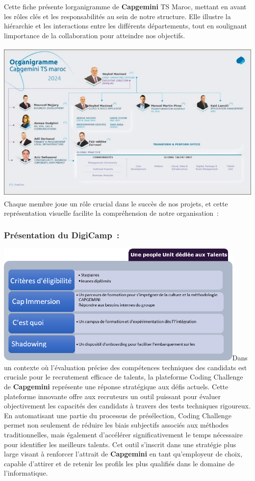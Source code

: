 \documentclass[12pt,a4paper,twoside]{report}
\begin{document}
Cette fiche présente l\textquotesingle organigramme de
\textbf{Capgemini} TS Maroc, mettant en avant les rôles clés et les
responsabilités au sein de notre structure. Elle illustre la hiérarchie
et les interactions entre les différents départements, tout en
soulignant l\textquotesingle importance de la collaboration pour
atteindre nos objectifs.

\includegraphics[width=5.4in,height=3.17361in]{latex_media/media/image5.jpeg}Chaque
membre joue un rôle crucial dans le succès de nos projets, et cette
représentation visuelle facilite la compréhension de notre
organisation~:

\hypertarget{pruxe9sentation-du-digicamp}{%
\subsubsection{Présentation du
DigiCamp~:}\label{pruxe9sentation-du-digicamp}}

\includegraphics[width=4.85208in,height=2.37778in]{latex_media/media/image6.png}Dans
un contexte où l'évaluation précise des compétences techniques des
candidats est cruciale pour le recrutement efficace de talents, la
plateforme Coding Challenge de \textbf{Capgemini} représente une réponse
stratégique aux défis actuels. Cette plateforme innovante offre aux
recruteurs un outil puissant pour évaluer objectivement les capacités
des candidats à travers des tests techniques rigoureux. En automatisant
une partie du processus de présélection, Coding Challenge permet non
seulement de réduire les biais subjectifs associés aux méthodes
traditionnelles, mais également d'accélérer significativement le temps
nécessaire pour identifier les meilleurs talents. Cet outil s'inscrit
dans une stratégie plus large visant à renforcer l'attrait de
\textbf{Capgemini} en tant qu'employeur de choix, capable d'attirer et
de retenir les profils les plus qualifiés dans le domaine de
l'informatique.
\end{document}
